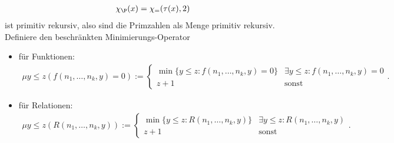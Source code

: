 \begin{solution}
\begin{enumerate}[label = (\alph*)]
\begin{enumerate}
\begin{align*}
					\chi_\P(x) = \chi_{=}(\tau(x), 2)
				\end{align*}
				ist primitiv rekursiv, also sind die Primzahlen als Menge primitiv rekursiv. \\
				Definiere den beschränkten Minimierungs-Operator
				\begin{itemize}
					\item für Funktionen:
						\begin{align*}
							\mu y \leq z(f(n_1,\dots,n_k,y) = 0) :=
							\begin{cases}
								\min\{y \leq z: f(n_1,\dots,n_k,y) = 0\} & \exists y \leq z: f(n_1,\dots,n_k,y) = 0 \\
								z + 1 & \text{sonst}
							\end{cases}.
						\end{align*}
					\item für Relationen:
					\begin{align*}
						\mu y \leq z(R(n_1,\dots,n_k,y)) :=
						\begin{cases}
							\min\{y \leq z: R(n_1,\dots,n_k,y)\} & \exists y \leq z: R(n_1,\dots,n_k,y) \\
							z + 1 & \text{sonst}
						\end{cases}.
					\end{align*}

				\end{itemize}


\end{enumerate}
\end{enumerate}
\end{solution}
